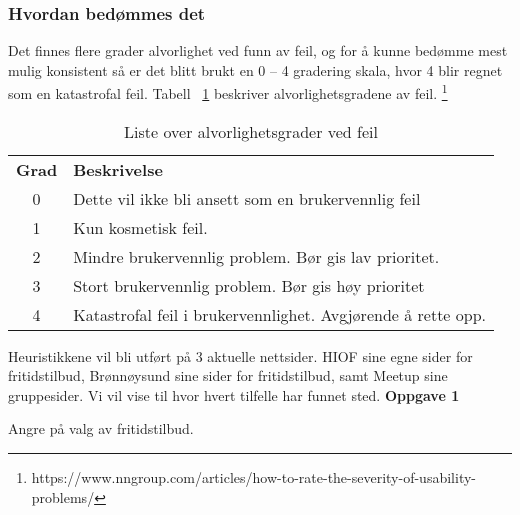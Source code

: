 \subsubsection{Hvordan bedømmes det}

Det finnes flere grader alvorlighet ved funn av feil, og for å kunne bedømme mest mulig konsistent så er det blitt brukt en 0 – 4 gradering skala, hvor 4 blir regnet som en katastrofal feil. Tabell ~\ref{table:heuristikkGrader} beskriver alvorlighetsgradene av feil.
\footnote{https://www.nngroup.com/articles/how-to-rate-the-severity-of-usability-problems/}


\begin{center}
\begin{table}[H]
\begin{tabular}{ c l }
 \textbf{Grad} & \textbf{Beskrivelse}  \\
 0 & Dette vil ikke bli ansett som en brukervennlig feil   \\
 1 & Kun kosmetisk feil. \\
 2 & Mindre brukervennlig problem. Bør gis lav prioritet.  \\
 3 & Stort brukervennlig problem. Bør gis høy prioritet  \\
 4 & Katastrofal feil i brukervennlighet. Avgjørende å rette opp.
\end{tabular}
 \caption{Liste over alvorlighetsgrader ved feil}
 \label{table:heuristikkGrader}
\end{table}
\end{center}


Heuristikkene vil bli utført på 3 aktuelle nettsider. HIOF sine egne sider for fritidstilbud, Brønnøysund sine sider for fritidstilbud, samt Meetup sine gruppesider. Vi vil vise til hvor hvert tilfelle har funnet sted.
\vspace{5mm} %
\newpage
\textbf{Oppgave 1} \par
Angre på valg av fritidstilbud.


